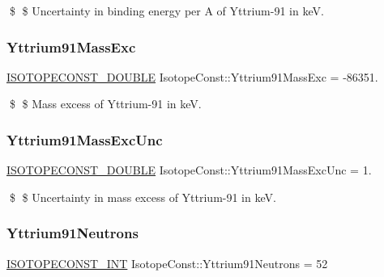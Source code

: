 \$ \$ Uncertainty in binding energy per A of Yttrium-\/91 in keV. \mbox{\label{group___isotope_const-_yttrium-_y91_ga14a932b1533bd1f49547ec03d40215f6}} 
\subsubsection{\texorpdfstring{Yttrium91\+Mass\+Exc}{Yttrium91MassExc}}
{\footnotesize\ttfamily \mbox{\hyperlink{group___isotope_const-_macros_ga8f45a7272ce02c0b4c65c44636ed719a}{I\+S\+O\+T\+O\+P\+E\+C\+O\+N\+S\+T\+\_\+\+D\+O\+U\+B\+LE}} Isotope\+Const\+::\+Yttrium91\+Mass\+Exc = -\/86351.}

\$ \$ Mass excess of Yttrium-\/91 in keV. \mbox{\label{group___isotope_const-_yttrium-_y91_gabcc64cf3acb07a24c07958be768168bd}} 
\subsubsection{\texorpdfstring{Yttrium91\+Mass\+Exc\+Unc}{Yttrium91MassExcUnc}}
{\footnotesize\ttfamily \mbox{\hyperlink{group___isotope_const-_macros_ga8f45a7272ce02c0b4c65c44636ed719a}{I\+S\+O\+T\+O\+P\+E\+C\+O\+N\+S\+T\+\_\+\+D\+O\+U\+B\+LE}} Isotope\+Const\+::\+Yttrium91\+Mass\+Exc\+Unc = 1.}

\$ \$ Uncertainty in mass excess of Yttrium-\/91 in keV. \mbox{\label{group___isotope_const-_yttrium-_y91_gaa5bb1505d804c5ba72877bfbfdaeb3da}} 
\subsubsection{\texorpdfstring{Yttrium91\+Neutrons}{Yttrium91Neutrons}}
{\footnotesize\ttfamily \mbox{\hyperlink{group___isotope_const-_macros_ga5f18360b3e99483a35c32d789e62621c}{I\+S\+O\+T\+O\+P\+E\+C\+O\+N\+S\+T\+\_\+\+I\+NT}} Isotope\+Const\+::\+Yttrium91\+Neutrons = 52}


